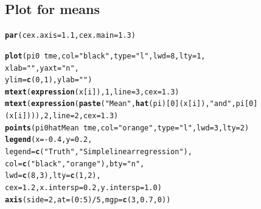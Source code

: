\documentclass{article}\usepackage[]{graphicx}\usepackage[]{color}
\makeatletter
\newcommand{\hlnum}[1]{\textcolor[rgb]{0.686,0.059,0.569}{#1}}%
\newcommand{\hlstr}[1]{\textcolor[rgb]{0.192,0.494,0.8}{#1}}%
\newcommand{\hlopt}[1]{\textcolor[rgb]{0,0,0}{#1}}%
\newcommand{\hlstd}[1]{\textcolor[rgb]{0.345,0.345,0.345}{#1}}%
\newcommand{\hlkwc}[1]{\textcolor[rgb]{0.333,0.667,0.333}{#1}}%
\newcommand{\hlkwd}[1]{\textcolor[rgb]{0.737,0.353,0.396}{\textbf{#1}}}%
\newenvironment{kframe}{%
 \def\at@end@of@kframe{}%
 \ifinner\ifhmode%
  \def\at@end@of@kframe{\end{minipage}}%
  \begin{minipage}{\columnwidth}%
 \fi\fi%
 \def\FrameCommand##1{\hskip\@totalleftmargin \hskip-\fboxsep
 \colorbox{shadecolor}{##1}\hskip-\fboxsep
     \hskip-\linewidth \hskip-\@totalleftmargin \hskip\columnwidth}%
 \MakeFramed {\advance\hsize-\width
   \@totalleftmargin\z@ \linewidth\hsize
   \@setminipage}}%
 {\par\unskip\endMakeFramed%
 \at@end@of@kframe}
\newenvironment{knitrout}{}{} %
\makeatother
\begin{document}
\subsection{Plot for means}

\begin{knitrout}
\color{fgcolor}\begin{kframe}
\begin{alltt}
\hlkwd{par}\hlstd{(}\hlkwc{cex.axis} \hlstd{=} \hlnum{1.1}\hlstd{,} \hlkwc{cex.main}\hlstd{=}\hlnum{1.3}\hlstd{)}

\hlkwd{plot}\hlstd{(pi0} \hlopt{~} \hlstd{tme,}\hlkwc{col}\hlstd{=}\hlstr{"black"}\hlstd{,}\hlkwc{type}\hlstd{=}\hlstr{"l"}\hlstd{,}\hlkwc{lwd}\hlstd{=}\hlnum{8}\hlstd{,} \hlkwc{lty}\hlstd{=}\hlnum{1}\hlstd{,}
     \hlkwc{xlab}\hlstd{=}\hlstr{""}\hlstd{,} \hlkwc{yaxt} \hlstd{=} \hlstr{"n"}\hlstd{,}
     \hlkwc{ylim}\hlstd{=}\hlkwd{c}\hlstd{(}\hlnum{0}\hlstd{,}\hlnum{1}\hlstd{),} \hlkwc{ylab}\hlstd{=}\hlstr{""}\hlstd{)}
\hlkwd{mtext}\hlstd{(}\hlkwd{expression}\hlstd{(x[i]),} \hlnum{1}\hlstd{,} \hlkwc{line}\hlstd{=}\hlnum{3}\hlstd{,} \hlkwc{cex}\hlstd{=}\hlnum{1.3}\hlstd{)}
\hlkwd{mtext}\hlstd{(}\hlkwd{expression}\hlstd{(}\hlkwd{paste}\hlstd{(}\hlstr{"Mean "}\hlstd{,} \hlkwd{hat}\hlstd{(pi)[}\hlnum{0}\hlstd{](x[i]),}\hlstr{" and "}\hlstd{, pi[}\hlnum{0}\hlstd{](x[i]))),} \hlnum{2}\hlstd{,} \hlkwc{line}\hlstd{=}\hlnum{2}\hlstd{,} \hlkwc{cex}\hlstd{=}\hlnum{1.3}\hlstd{)}
\hlkwd{points}\hlstd{(pi0hatMean} \hlopt{~} \hlstd{tme,}\hlkwc{col}\hlstd{=}\hlstr{"orange"}\hlstd{,}\hlkwc{type}\hlstd{=}\hlstr{"l"}\hlstd{,}\hlkwc{lwd}\hlstd{=}\hlnum{3}\hlstd{,} \hlkwc{lty}\hlstd{=}\hlnum{2}\hlstd{)}
\hlkwd{legend}\hlstd{(}\hlkwc{x}\hlstd{=}\hlopt{-}\hlnum{0.4}\hlstd{,} \hlkwc{y}\hlstd{=}\hlnum{0.2}\hlstd{,}
       \hlkwc{legend}\hlstd{=}\hlkwd{c}\hlstd{(}\hlstr{"Truth"}\hlstd{,} \hlstr{"Simple linear regression"}\hlstd{),}
       \hlkwc{col}\hlstd{=}\hlkwd{c}\hlstd{(}\hlstr{"black"}\hlstd{,} \hlstr{"orange"}\hlstd{),} \hlkwc{bty}\hlstd{=}\hlstr{"n"}\hlstd{,}
       \hlkwc{lwd}\hlstd{=}\hlkwd{c}\hlstd{(}\hlnum{8}\hlstd{,}\hlnum{3}\hlstd{),} \hlkwc{lty}\hlstd{=}\hlkwd{c}\hlstd{(}\hlnum{1}\hlstd{,}\hlnum{2}\hlstd{),}
       \hlkwc{cex}\hlstd{=}\hlnum{1.2}\hlstd{,} \hlkwc{x.intersp}\hlstd{=}\hlnum{0.2}\hlstd{,} \hlkwc{y.intersp}\hlstd{=}\hlnum{1.0}\hlstd{)}
\hlkwd{axis}\hlstd{(}\hlkwc{side}\hlstd{=}\hlnum{2}\hlstd{,} \hlkwc{at}\hlstd{=(}\hlnum{0}\hlopt{:}\hlnum{5}\hlstd{)}\hlopt{/}\hlnum{5}\hlstd{,} \hlkwc{mgp}\hlstd{=}\hlkwd{c}\hlstd{(}\hlnum{3}\hlstd{,} \hlnum{0.7}\hlstd{,} \hlnum{0}\hlstd{))}
\end{alltt}
\end{kframe}


\end{knitrout}
\end{document}
